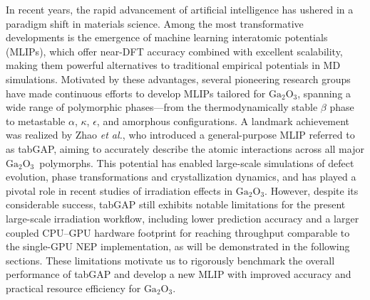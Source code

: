 \documentclass[aip,graphicx,amsmath,amssymb]{revtex4-1}
\newcommand{\ga}{$\text{Ga}_2\text{O}_3$}
\begin{document}
In recent years, the rapid advancement of artificial intelligence has ushered in a 
paradigm shift in materials science.\cite{pyzer-knapp_accelerating_2022} 
Among the most transformative developments is the emergence of machine learning interatomic 
potentials (MLIPs), which offer near-DFT accuracy combined with excellent scalability, 
making them powerful alternatives to traditional empirical potentials 
in MD simulations.\cite{ko_recent_2023} 
Motivated by these advantages, several pioneering research groups have made 
continuous efforts to develop MLIPs tailored for \ga, spanning a wide range of polymorphic 
phases---from the thermodynamically stable $\beta$ phase\cite{li_deep_2020,liu_machine_2020,zhao_phase_2021} 
to metastable $\alpha$,\cite{sun_neuroevolution_2023} $\kappa$,\cite{wang_dissimilar_2024} 
$\epsilon$,\cite{sun_neuroevolution_2023} and amorphous configurations.\cite{liu_unraveling_2023} 
A landmark achievement was realized by Zhao \textit{et al.},\cite{zhao_complex_2023} 
who introduced a general-purpose MLIP referred to as tabGAP, aiming to accurately 
describe the atomic interactions across all major \ga\ polymorphs. 
This potential has enabled large-scale simulations of 
defect evolution,\cite{he_threshold_2024,he_ultrahigh_2024,liu_orientation-dependent_2025} 
phase transformations\cite{azarov_self-assembling_2025} 
and crystallization dynamics,\cite{zhang_orientation-dependent_2023,li_edge-dependent_2025} 
and has played a pivotal role in recent studies of irradiation effects in 
\ga.\cite{azarov_universal_2023,zhao_crystallization_2025,han_electronic_2025,abdullaev_ions_2025} 
However, despite its considerable success, tabGAP still exhibits notable limitations for the 
present large-scale irradiation workflow, including lower prediction accuracy and a larger 
coupled CPU--GPU hardware footprint for reaching throughput comparable to the single-GPU 
NEP implementation, as will be demonstrated in the following sections. 
These limitations motivate us to rigorously benchmark the overall 
performance of tabGAP and develop a new MLIP with improved accuracy and practical 
resource efficiency for \ga.
\end{document}
